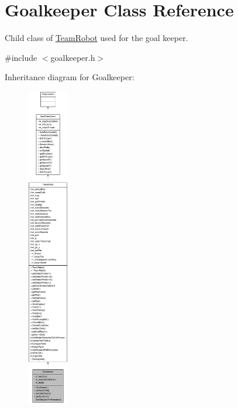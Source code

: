\hypertarget{classGoalkeeper}{
\section{Goalkeeper Class Reference}
\label{classGoalkeeper}
}


Child class of \hyperlink{classTeamRobot}{TeamRobot} used for the goal keeper.  




{\ttfamily \#include $<$goalkeeper.h$>$}



Inheritance diagram for Goalkeeper:\nopagebreak
\begin{figure}[H]
\begin{center}
\leavevmode
\includegraphics[height=400pt]{classGoalkeeper__inherit__graph}
\end{center}
\end{figure}
